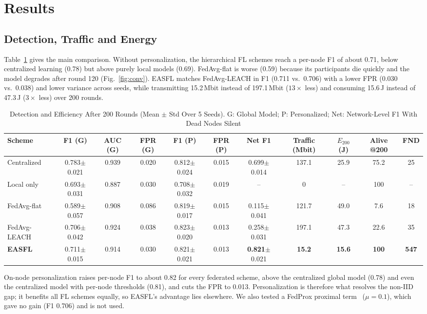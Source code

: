 \documentclass[journal]{IEEEtran}
\newcommand{\pmv}[2]{#1{\scriptsize$\pm$#2}}
\begin{document}
\section{Results}\label{sec:results}
\subsection{Detection, Traffic and Energy}
Table~\ref{tab:main} gives the main comparison. Without personalization, the hierarchical FL schemes reach a per-node F1 of about 0.71, below centralized learning (0.78) but above purely local models (0.69). FedAvg-flat is worse (0.59) because its participants die quickly and the model degrades after round 120 (Fig.~\ref{fig:conv}). EASFL matches FedAvg-LEACH in F1 (0.711 vs.\ 0.706) with a lower FPR (0.030 vs.\ 0.038) and lower variance across seeds, while transmitting 15.2\,Mbit instead of 197.1\,Mbit ($13\times$ less) and consuming 15.6\,J instead of 47.3\,J ($3\times$ less) over 200 rounds.

\begin{table}[t]
\caption{Detection and Efficiency After 200 Rounds (Mean $\pm$ Std Over 5 Seeds). G: Global Model; P: Personalized; Net: Network-Level F1 With Dead Nodes Silent}\label{tab:main}
\centering\footnotesize
\begin{tabular}{@{}lcccccccccc@{}}
\toprule
Scheme & F1 (G) & AUC (G) & FPR (G) & F1 (P) & FPR (P) & Net F1 & Traffic (Mbit) & $E_{200}$ (J) & Alive @200 & FND\\
\midrule
Centralized & \pmv{0.783}{0.021} & 0.939 & 0.020 & \pmv{0.812}{0.024} & 0.015 & \pmv{0.699}{0.014} & 137.1 & 25.9 & 75.2 & 25\\
Local only & \pmv{0.693}{0.031} & 0.887 & 0.030 & \pmv{0.708}{0.032} & 0.019 & -- & 0 & -- & 100 & --\\
FedAvg-flat & \pmv{0.589}{0.057} & 0.908 & 0.086 & \pmv{0.819}{0.017} & 0.015 & \pmv{0.115}{0.041} & 121.7 & 49.0 & 7.6 & 18\\
FedAvg-LEACH & \pmv{0.706}{0.042} & 0.924 & 0.038 & \pmv{0.823}{0.020} & 0.013 & \pmv{0.258}{0.031} & 197.1 & 47.3 & 22.6 & 35\\
\textbf{EASFL} & \pmv{0.711}{0.015} & 0.914 & 0.030 & \pmv{0.821}{0.021} & 0.013 & \pmv{\textbf{0.821}}{0.021} & \textbf{15.2} & \textbf{15.6} & \textbf{100} & \textbf{547}\\
\bottomrule
\end{tabular}
\end{table}

On-node personalization raises per-node F1 to about 0.82 for every federated scheme, above the centralized global model (0.78) and even the centralized model with per-node thresholds (0.81), and cuts the FPR to 0.013. Personalization is therefore what resolves the non-IID gap; it benefits all FL schemes equally, so EASFL's advantage lies elsewhere. We also tested a FedProx proximal term~\cite{li2020fedprox} ($\mu=0.1$), which gave no gain (F1 0.706) and is not used.
\end{document}
